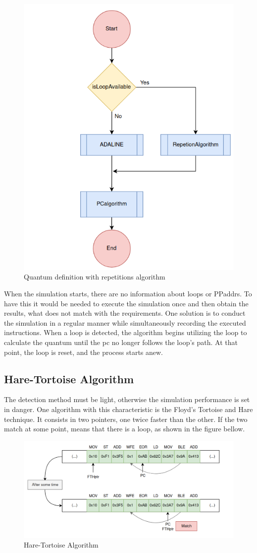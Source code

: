 \begin{figure}[h!]
	\centering
 	\includegraphics[width=0.5\linewidth]{Images/ADA_and_REP.png}
 	\caption{Quantum definition with repetitions algorithm}
	 \label{fig_ADA_and_REP}
\end{figure}


When the simulation starts, there are no information about loops or PPaddrs. To have this it would be needed to execute the simulation once and then obtain the results, what does not match with the requirements. One solution is to conduct the simulation in a regular manner while simultaneously recording the executed instructions. When a loop is detected, the algorithm begins utilizing the loop to calculate the quantum until the \gls{pc} no longer follows the loop's path. At that point, the loop is reset, and the process starts anew.

\subsection{Hare-Tortoise Algorithm}

The detection method must be light, otherwise the simulation performance is set in danger. One algorithm with this characteristic is the Floyd's Tortoise and Hare technique. It consists in two pointers, one twice faster than the other. If the two match at some point, means that there is a loop, as shown in the figure bellow.

\begin{figure}[H]
	\centering
 	\includegraphics[width=0.8\linewidth]{Images/FTH_algorithm.png}
 	\caption{Hare-Tortoise Algorithm}
	 \label{fig_FTH_algorithm}
\end{figure}

